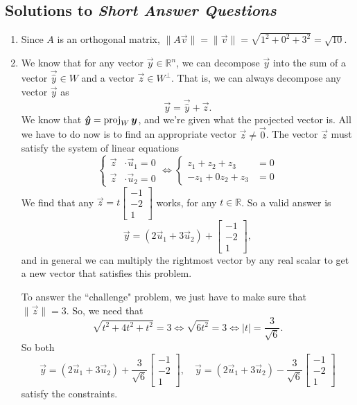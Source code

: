 \subsection{Solutions to \textit{Short Answer Questions}}
	\begin{enumerate}
		\item Since \(A\) is an orthogonal matrix, \(\|A\vec{v}\| = \|\vec{v}\| = \sqrt{1^2 + 0^2 + 3^2} = \sqrt{10}\).
		\item We know that for any vector \(\vec{y} \in \mathbb{R}^n\), we can decompose \(\vec{y}\) into the sum of a vector \(\vec{\hat{y}} \in W\) and
			a vector \(\vec{z} \in W^\perp\). That is, we can always decompose any vector \(\vec{y}\) as \[\vec{y} = \vec{\hat{y}} + \vec{z}.\] We know that
			\(\bm{\hat{y}} = \operatorname{proj}_W\bm{y}\), and we're given what the projected vector is. All we have to do now is to find an appropriate vector 
			\(\vec{z} \ne \vec{0}\). The vector \(\vec{z}\) must satisfy the system of linear equations 
			\[\left\{\begin{aligned}
				\vec{z} &\cdot \vec{u}_1 = 0 \\
				\vec{z} &\cdot \vec{u}_2 = 0
			\end{aligned}\right. \iff \left\{\begin{aligned}z_1 + z_2 + z_3 &= 0  \\ -z_1 + 0z_2 + z_3 &= 0\end{aligned}\right.\]
			We find that any \(\vec{z} = t\begin{bmatrix}-1 \\ -2 \\ 1\end{bmatrix}\) works, for any \(t \in \mathbb{R}\). So a valid answer is 
			\[\vec{y} = (2\vec{u}_1 + 3\vec{u}_2) + \begin{bmatrix}-1 \\ -2 \\ 1\end{bmatrix},\] and in general we can multiply the rightmost vector by 
			any real scalar to get a new vector that satisfies this problem.

			To answer the ``challenge" problem, we just have to make sure that \(\|\vec{z}\| = 3\). So, we need that 
			\[\sqrt{t^2 + 4t^2 + t^2} = 3 \iff \sqrt{6t^2} = 3 \iff \lvert t \rvert = \frac{3}{\sqrt{6}}.\] So both 
			\[\vec{y} = (2\vec{u}_1 + 3\vec{u}_2) + \frac{3}{\sqrt{6}}\begin{bmatrix}-1 \\ -2 \\ 1\end{bmatrix}, \quad \vec{y} = (2\vec{u}_1 + 3\vec{u}_2) - \frac{3}{\sqrt{6}}\begin{bmatrix}-1 \\ -2 \\ 1\end{bmatrix}\] satisfy the constraints.


\end{enumerate}
